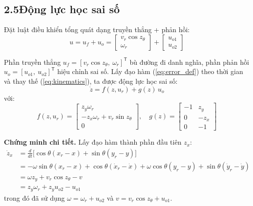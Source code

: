 \documentclass[12pt,a4paper]{article}
\newcommand{\T}{\mathsf{T}}
\begin{document}
\subsection*{2.5\quad Động lực học sai số}

Đặt luật điều khiển tổng quát dạng truyền thẳng + phản hồi:
\begin{equation}\label{eq:control_split}
    u = u_f + u_o = \begin{bmatrix} v_r\cos z_\theta \\ \omega_r \end{bmatrix} + \begin{bmatrix} u_{o1} \\ u_{o2} \end{bmatrix}
\end{equation}

Phần truyền thẳng $u_f = [v_r\cos z_\theta,\ \omega_r]^\T$ bù đường đi danh nghĩa, phần phản hồi $u_o = [u_{o1},\ u_{o2}]^\T$ hiệu chỉnh sai số. Lấy đạo hàm (\ref{eq:error_def}) theo thời gian và thay thế (\ref{eq:kinematics}), ta được động lực học sai số:
\begin{equation}\label{eq:error_dynamics}
    \boxed{\dot{z} = f(z, u_r) + g(z)\, u_o}
\end{equation}
với:
\begin{equation}\label{eq:f_and_g}
    f(z, u_r) = \begin{bmatrix} z_y\omega_r \\ -z_x\omega_r + v_r\sin z_\theta \\ 0 \end{bmatrix}, \quad
    g(z) = \begin{bmatrix} -1 & z_y \\ 0 & -z_x \\ 0 & -1 \end{bmatrix}
\end{equation}

\textbf{Chứng minh chi tiết.} Lấy đạo hàm thành phần đầu tiên $z_x$:
\begin{align}
    \dot{z}_x &= \frac{d}{dt}\big[\cos\theta(x_r - x) + \sin\theta(y_r - y)\big] \nonumber \\
    &= -\omega\sin\theta(x_r - x) + \cos\theta(\dot{x}_r - \dot{x})
    + \omega\cos\theta(y_r - y) + \sin\theta(\dot{y}_r - \dot{y}) \nonumber \\
    &= \omega z_y + v_r\cos z_\theta - v \nonumber \\
    &= z_y\omega_r + z_y u_{o2} - u_{o1} \label{eq:zx_deriv}
\end{align}
trong đó đã sử dụng $\omega = \omega_r + u_{o2}$ và $v = v_r\cos z_\theta + u_{o1}$.
\end{document}
